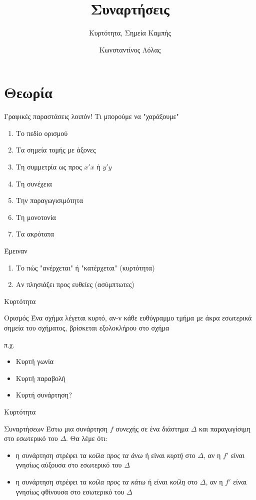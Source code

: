 \documentclass{../presentation}
\title{Συναρτήσεις}
\subtitle{Κυρτότητα, Σημεία Καμπής}
\author[Λόλας]{Κωνσταντίνος Λόλας}
\institute[$10^ο$ ΓΕΛ]{$10^ο$ ΓΕΛ Θεσσαλονίκης}
\begin{document}
\begin{frame}
  \titlepage
\end{frame}

\section{Θεωρία}
\begin{frame}{Γραφικές παραστάσεις λοιπόν!}
  Τι μπορούμε να "χαράξουμε"
  \begin{enumerate}
    \item Το πεδίο ορισμού
    \item Τα σημεία τομής με άξονες
    \item Τη συμμετρία ως προς $x'x$ ή $y'y$
    \item Τη συνέχεια
    \item Την παραγωγισιμότητα
    \item Τη μονοτονία
    \item Τα ακρότατα
  \end{enumerate}
   Έμειναν
  \begin{enumerate}
    \item<3-> Το πώς "ανέρχεται" ή "κατέρχεται" (κυρτότητα)
    \item<4-> Αν πλησιάζει προς ευθείες (ασύμπτωτες)
  \end{enumerate}
\end{frame}

\begin{frame}{Κυρτότητα}
  \begin{block}{Ορισμός}
    Ένα σχήμα λέγεται κυρτό, αν-ν κάθε ευθύγραμμο τμήμα με άκρα εσωτερικά σημεία του σχήματος, βρίσκεται εξολοκλήρου στο σχήμα
  \end{block}
   π.χ.
  \begin{itemize}
    \item<3-> Κυρτή γωνία 
    \item<5-> Κυρτή παραβολή 
    \item<7-> Κυρτή συνάρτηση?
  \end{itemize}
\end{frame}

\begin{frame}{Κυρτότητα}
  \begin{block}{Συναρτήσεων}
    Έστω μια συνάρτηση $f$ συνεχής σε ένα διάστημα $Δ$ και παραγωγίσιμη στο εσωτερικό του $Δ$. Θα λέμε ότι:
    \begin{itemize}
      \item η συνάρτηση στρέφει τα \emph{κοίλα προς τα άνω} ή είναι \emph{κυρτή} στο $Δ$, αν η $f'$ είναι γνησίως αύξουσα στο εσωτερικό του $Δ$
      \item η συνάρτηση στρέφει τα \emph{κοίλα προς τα κάτω} ή είναι \emph{κοίλη} στο $Δ$, αν η $f'$ είναι γνησίως φθίνουσα στο εσωτερικό του $Δ$
    \end{itemize}
  \end{block}
\end{frame}
\end{document}
